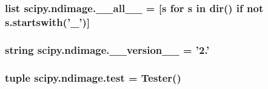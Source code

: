 \subsubsection[{\+\_\+\+\_\+all\+\_\+\+\_\+}]{\setlength{\rightskip}{0pt plus 5cm}list scipy.\+ndimage.\+\_\+\+\_\+all\+\_\+\+\_\+ = \mbox{[}{\bf s} for {\bf s} in dir() {\bf if} not s.\+startswith('\+\_\+')\mbox{]}}\label{namespacescipy_1_1ndimage_a3157393e70fe2b865c39df03f3abab9b}
\hypertarget{namespacescipy_1_1ndimage_adaa87b576cea55ab6bcf02ea3a9d82aa}{}
\subsubsection[{\+\_\+\+\_\+version\+\_\+\+\_\+}]{\setlength{\rightskip}{0pt plus 5cm}string scipy.\+ndimage.\+\_\+\+\_\+version\+\_\+\+\_\+ = '2.'}\label{namespacescipy_1_1ndimage_adaa87b576cea55ab6bcf02ea3a9d82aa}
\hypertarget{namespacescipy_1_1ndimage_a5e868031feea4e6814b1a39a42cc793a}{}
\subsubsection[{test}]{\setlength{\rightskip}{0pt plus 5cm}tuple scipy.\+ndimage.\+test = Tester()}\label{namespacescipy_1_1ndimage_a5e868031feea4e6814b1a39a42cc793a}
